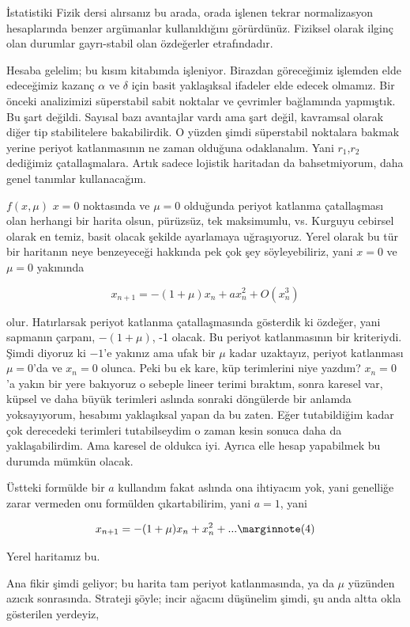\documentclass[12pt,fleqn]{article}\usepackage{../../common}
\begin{document}
İstatistiki Fizik dersi alırsanız bu arada, orada işlenen tekrar normalizasyon
hesaplarında benzer argümanlar kullanıldığını görürdünüz. Fiziksel olarak ilginç
olan durumlar gayrı-stabil olan özdeğerler etrafındadır.

Hesaba gelelim; bu kısım kitabımda işleniyor. Birazdan göreceğimiz işlemden elde
edeceğimiz kazanç $\alpha$ ve $\delta$ için basit yaklaşıksal ifadeler elde
edecek olmamız. Bir önceki analizimizi süperstabil sabit noktalar ve çevrimler
bağlamında yapmıştık. Bu şart değildi. Sayısal bazı avantajlar vardı ama şart
değil, kavramsal olarak diğer tip stabilitelere bakabilirdik. O yüzden şimdi
süperstabil noktalara bakmak yerine periyot katlanmasının ne zaman olduğuna
odaklanalım. Yani $r_1$,$r_2$ dediğimiz çatallaşmalara. Artık sadece lojistik
haritadan da bahsetmiyorum, daha genel tanımlar kullanacağım.

$f(x,\mu)$ $x=0$ noktasında ve $\mu=0$ olduğunda periyot katlanma çatallaşması
olan herhangi bir harita olsun, pürüzsüz, tek maksimumlu, vs. Kurguyu cebirsel
olarak en temiz, basit olacak şekilde ayarlamaya uğraşıyoruz. Yerel olarak bu
tür bir haritanın neye benzeyeceği hakkında pek çok şey söyleyebiliriz, yani
$x=0$ ve $\mu=0$ yakınında

$$ x_{n+1} = -(1+\mu)x_n  + a x_n^2 + O(x_n^3)  $$

olur. Hatırlarsak periyot katlanma çatallaşmasında gösterdik ki özdeğer, yani
sapmanın çarpanı, $-(1+\mu)$, -1 olacak. Bu periyot katlanmasının bir
kriteriydi. Şimdi diyoruz ki $-1$'e yakınız ama ufak bir $\mu$ kadar uzaktayız,
periyot katlanması $\mu=0$'da ve $x_n=0$ olunca. Peki bu ek kare, küp
terimlerini niye yazdım? $x_n=0$'a yakın bir yere bakıyoruz o sebeple lineer
terimi bıraktım, sonra karesel var, küpsel ve daha büyük terimleri aslında
sonraki döngülerde bir anlamda yoksayıyorum, hesabımı yaklaşıksal yapan da bu
zaten. Eğer tutabildiğim kadar çok derecedeki terimleri tutabilseydim o zaman
kesin sonuca daha da yaklaşabilirdim. Ama karesel de oldukca iyi. Ayrıca elle
hesap yapabilmek bu durumda mümkün olacak. 

Üstteki formülde bir $a$ kullandım fakat aslında ona ihtiyacım yok, yani
genelliğe zarar vermeden onu formülden çıkartabilirim, yani $a=1$, yani

$$ 
x_{n+1} = -(1+\mu)x_n  +x_n^2 + ...  
\mlabel{4} 
$$

Yerel haritamız bu. 

Ana fikir şimdi geliyor; bu harita tam periyot katlanmasında, ya da $\mu$
yüzünden azıcık sonrasında. Strateji şöyle; incir ağacını düşünelim şimdi, şu
anda altta okla gösterilen yerdeyiz,
\end{document}
